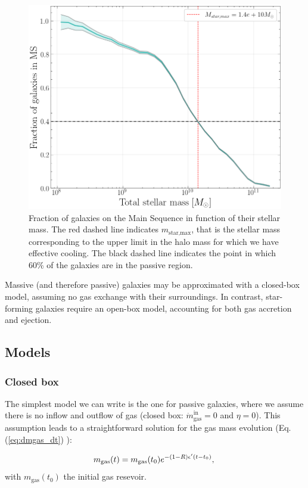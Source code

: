 \documentclass[fleqn,usenatbib]{mnras}
\begin{document}
\begin{figure}\centering
	\includegraphics[width=0.86\columnwidth]{images/Frac_MS_mass.png}
    \caption{Fraction of galaxies on the Main Sequence in function of their stellar mass. The red dashed line indicates $m_\text{star,max}$, that is the stellar mass corresponding to the upper limit in the halo mass for which we have effective cooling. The black dashed line indicates the point in which 60\% of the galaxies are in the passive region.}
    \label{fig:frac_MS}
\end{figure}

Massive (and therefore passive) galaxies may be approximated with a closed-box model, assuming no gas exchange with their surroundings. In contrast, star-forming galaxies require an open-box model, accounting for both gas accretion and ejection.


\subsection{Models}
\label{models} %

\subsubsection{\textbf{Closed box}}
The simplest model we can write is the one for passive galaxies, where we assume there is no inflow and outflow of gas (closed box: $\dot{m}_\text{gas}^\text{in}=0$ and $\eta=0$). This assumption leads to a straightforward solution for the gas mass evolution (Eq. (\ref{eq:dmgas_dt}) ):

{\fontsize{9pt}{9pt}\begin{equation}
m_\text{gas}(t) = m_\text{gas}(t_0)e^{-(1-R)\epsilon' (t-t_0)},\\
	\label{eq:mgas_closedbox}
\end{equation}}
with $m_\text{gas}(t_0)$ the initial gas resevoir.\\
\end{document}

